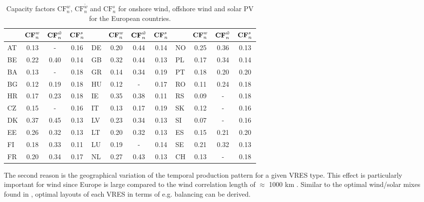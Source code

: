 \documentclass[a4paper, 5p, sort&compress]{elsarticle}%
\begin{document}
\begin{table}[t!]
  \caption{Capacity factors $\text{CF}_n^w$, $\text{CF}_n^{\tilde{w}}$ and  $\text{CF}_n^s$ for onshore wind, offshore wind and solar PV for the European countries.}
  \label{tab:capacity-factors}
  \begin{adjustbox}{center}
    \begin{tabular}{lccclccclccc}  \toprule
      & $\text{\textbf{CF}}_n^w$ & $\text{\textbf{CF}}_n^{\tilde{w}}$ & $\text{\textbf{CF}}_n^s$ &  & $\text{\textbf{CF}}_n^w$ &
      $\text{\textbf{CF}}_n^{\tilde{w}}$ & $\text{\textbf{CF}}_n^s$ &  & $\text{\textbf{CF}}_n^w$ & $\text{\textbf{CF}}_n^{\tilde{w}}$ &
      $\text{\textbf{CF}}_n^s$\\ \midrule
      AT & 0.13 & - & 0.16 & DE & 0.20 & 0.44 & 0.14 & NO & 0.25 & 0.36 & 0.13\\
      BE & 0.22 & 0.40 & 0.14 & GB & 0.32 & 0.44 & 0.13 & PL & 0.17 & 0.34 & 0.14\\
      BA & 0.13 & - & 0.18 & GR & 0.14 & 0.34 & 0.19 & PT & 0.18 & 0.20 & 0.20\\
      BG & 0.12 & 0.19 & 0.18 & HU & 0.12 & - & 0.17 & RO & 0.11 & 0.24 & 0.18\\
      HR & 0.17 & 0.23 & 0.18 & IE & 0.35 & 0.38 & 0.11 & RS & 0.09 & - & 0.18\\
      CZ & 0.15 & - & 0.16 & IT & 0.13 & 0.17 & 0.19 & SK & 0.12 & - & 0.16\\
      DK & 0.37 & 0.45 & 0.13 & LV & 0.23 & 0.34 & 0.13 & SI & 0.07 & - & 0.16\\
      EE & 0.26 & 0.32 & 0.13 & LT & 0.20 & 0.32 & 0.13 & ES & 0.15 & 0.21 & 0.20\\
      FI & 0.18 & 0.33 & 0.11 & LU & 0.19 & - & 0.14 & SE & 0.21 & 0.32 & 0.13\\
      FR & 0.20 & 0.34 & 0.17 & NL & 0.27 & 0.43 & 0.13 & CH & 0.13 & - & 0.18\\ \bottomrule
    \end{tabular}
  \end{adjustbox}
\end{table}


The second reason is the geographical variation of the temporal
production pattern for a given VRES type. This effect is particularly
important for wind since Europe is large compared to the wind
correlation length of $\approx$ 1000 km \cite{Widen2011}. Similar to
the optimal wind/solar mixes found in \cite{Heide2010,Heide2011},
optimal layouts of each VRES in terms of e.g. balancing can be
derived.
\end{document}
